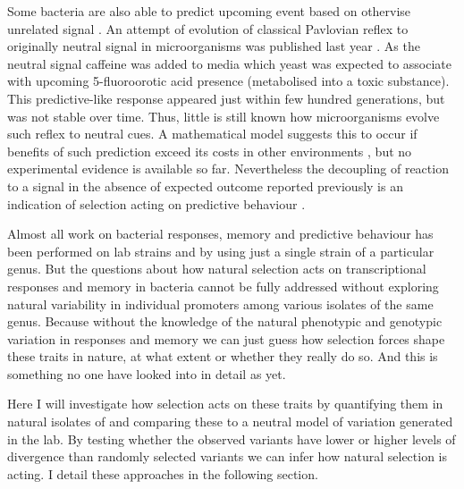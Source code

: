Some bacteria are also able to predict upcoming event based on othervise unrelated signal \cite{kondo1993circadian, min2005rhythmic, tagkopoulos2008predictive, mitchell2009adaptive}.
An attempt of evolution of classical Pavlovian reflex to originally neutral signal in microorganisms was published last year \cite{lopez2017adaptive}.
As the neutral signal caffeine was added to media which yeast  was expected to associate with upcoming 5-fluoroorotic acid presence (metabolised into a toxic substance).
This predictive-like response appeared just within few hundred generations, but was not stable over time.
Thus, little is still known how microorganisms evolve such reflex to neutral cues.
A mathematical model suggests this to occur if benefits of such prediction exceed its costs in other environments \cite{mitchell2011mathematical}, but no experimental evidence is available so far.
Nevertheless the decoupling of reaction to a signal in the absence of expected outcome reported previously is an indication of selection acting on predictive behaviour \cite{tagkopoulos2008predictive, mitchell2009adaptive}.

Almost all work on bacterial responses, memory and predictive behaviour has been performed on lab strains and by using just a single strain of a particular genus.
But the questions about how natural selection acts on transcriptional responses and memory in bacteria cannot be fully addressed without exploring natural variability in individual promoters among various isolates of the same genus.
Because without the knowledge of the natural phenotypic and genotypic variation in responses and memory we can just guess how selection forces shape these traits in nature, at what extent or whether they really do so.
And this is something no one have looked into in detail as yet.

Here I will investigate how selection acts on these traits by quantifying them in natural isolates of  and comparing these to a neutral model of variation generated in the lab.
By testing whether the observed variants have lower or higher levels of divergence than randomly selected variants we can infer how natural selection is acting.
I detail these approaches in the following section.


